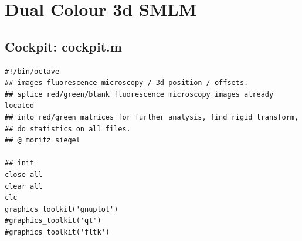 \documentclass[11pt, a4paper, oneside, twocolumn]{report}
\begin{document}
\clearpage\section{Dual Colour 3d SMLM}\label{s:c:dc}


\subsection{Cockpit: cockpit.m}\label{s:c:cockpit}

\begin{verbatim}
#!/bin/octave
## images fluorescence microscopy / 3d position / offsets.
## splice red/green/blank fluorescence microscopy images already located
## into red/green matrices for further analysis, find rigid transform,
## do statistics on all files.
## @ moritz siegel

## init
close all
clear all
clc
graphics_toolkit('gnuplot')
#graphics_toolkit('qt')
#graphics_toolkit('fltk')


\end{verbatim}
\end{document}
